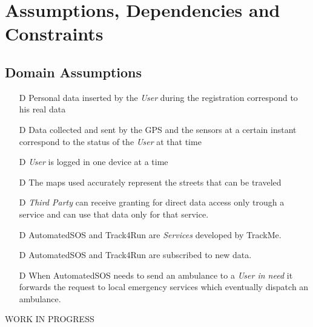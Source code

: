\documentclass[../../rasd.tex]{subfiles}
\begin{document}
\section{Assumptions, Dependencies and Constraints}
		\subsection{Domain Assumptions}
			 	\begin{itemize}
				 	\item[D\subs{1}]Personal data inserted by the \textit{User} during the registration correspond to his real data
					\item[D\subs{2}]Data collected and sent by the GPS and the sensors at a certain instant correspond to the status of the \textit{User} at that time
				
					\item[D\subs{3}]\textit{User} is logged in one device at a time

					\item[D\subs{4}]The maps used accurately represent the streets that can be traveled
					\item[D\subs{5}]\textit{Third Party} can receive granting for direct data access only trough a service and can use that data only for that service.
					\item[D\subs{6}]AutomatedSOS and Track4Run are \textit{Services} developed by TrackMe.
					\item[D\subs{7}]AutomatedSOS and Track4Run are subscribed to new data.
					\item[D\subs{8}]When AutomatedSOS needs to send an ambulance to a \textit{User in need} it forwards the request to local emergency services which eventually dispatch an ambulance.
					
				\end{itemize}
		WORK IN PROGRESS
		
\end{document}
